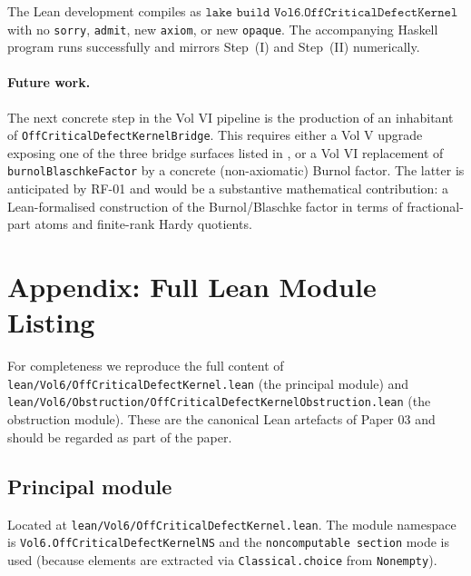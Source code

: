 \documentclass[12pt]{article}
\theoremstyle{definition}
\theoremstyle{remark}
\begin{document}
The Lean development compiles as
\(
\texttt{lake build Vol6.OffCriticalDefectKernel}
\)
with no \texttt{sorry}, \texttt{admit}, new \texttt{axiom}, or new
\texttt{opaque}. The accompanying Haskell program runs successfully and
mirrors Step~(I) and Step~(II) numerically.

\paragraph{Future work.} The next concrete step in the Vol VI pipeline
is the production of an inhabitant of
\texttt{OffCriticalDefectKernelBridge}. This requires either a Vol V
upgrade exposing one of the three bridge surfaces listed in
, or a Vol VI replacement of
\texttt{burnolBlaschkeFactor} by a concrete (non-axiomatic) Burnol
factor. The latter is anticipated by RF-01 and would be a substantive
mathematical contribution: a Lean-formalised construction of the
Burnol/Blaschke factor in terms of fractional-part atoms and
finite-rank Hardy quotients.

\section{Appendix: Full Lean Module Listing}\label{sec:lean-listing}

For completeness we reproduce the full content of
\texttt{lean/Vol6/OffCriticalDefectKernel.lean} (the principal module) and
\texttt{lean/Vol6/Obstruction/OffCriticalDefectKernelObstruction.lean}
(the obstruction module). These are the canonical Lean artefacts of
Paper 03 and should be regarded as part of the paper.

\subsection{Principal module}

Located at \texttt{lean/Vol6/OffCriticalDefectKernel.lean}. The module
namespace is \texttt{Vol6.OffCriticalDefectKernelNS} and the
\texttt{noncomputable section} mode is used (because elements are
extracted via \texttt{Classical.choice} from \texttt{Nonempty}).
\end{document}
